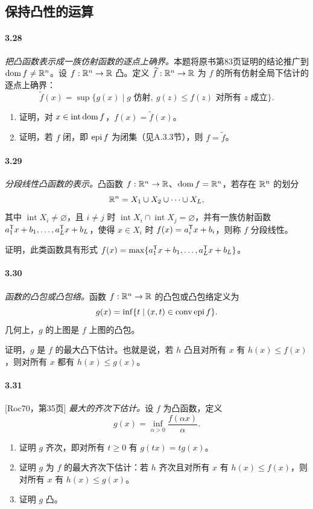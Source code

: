 \subsection*{保持凸性的运算}
\paragraph{3.28}\textit{把凸函数表示成一族仿射函数的逐点上确界。}本题将原书第83页证明的结论推广到 $\operatorname{dom} f\ne\mathbb R^n$。设 $f:\mathbb R^n\to\mathbb R$ 凸。定义 $\widetilde f:\mathbb R^n\to\mathbb R$ 为 $f$ 的所有仿射全局下估计的逐点上确界：
\[\widetilde f(x)=\sup\{g(x)\mid g\text{ 仿射},\ g(z)\leq f(z)\text{ 对所有 }z\text{ 成立}\}.\]
\begin{enumerate}[label=(\alph*)]
\item 证明，对 $x\in\operatorname{int}\operatorname{dom} f$，$f(x)=\widetilde f(x)$。
\item 证明，若 $f$ 闭，即 $\operatorname{epi} f$ 为闭集（见A.3.3节），则 $f=\widetilde f$。
\end{enumerate}
\paragraph{3.29}\textit{分段线性凸函数的表示。}凸函数 $f:\mathbb R^n\to\mathbb R$、$\operatorname{dom} f=\mathbb R^n$，若存在 $\mathbb R^n$ 的划分
\[\mathbb R^n=X_1\cup X_2\cup\cdots\cup X_L,\]
其中 $\operatorname{int}X_i\ne\varnothing$，且 $i\ne j$ 时 $\operatorname{int}X_i\cap\operatorname{int}X_j=\varnothing$，并有一族仿射函数 $a_1^\mathsf T x+b_1,\ldots,a_L^\mathsf T x+b_L$，使得 $x\in X_i$ 时 $f(x)=a_i^\mathsf T x+b_i$，则称 $f$ 分段线性。

证明，此类函数具有形式 $f(x)=\max\{a_1^\mathsf T x+b_1,\ldots,a_L^\mathsf T x+b_L\}$。
\paragraph{3.30}\textit{函数的凸包或凸包络。}函数 $f:\mathbb R^n\to\mathbb R$ 的凸包或凸包络定义为
\[g(x)=\inf\{t\mid(x,t)\in\operatorname{conv}\operatorname{epi} f\}.\]
几何上，$g$ 的上图是 $f$ 上图的凸包。

证明，$g$ 是 $f$ 的最大凸下估计。也就是说，若 $h$ 凸且对所有 $x$ 有 $h(x)\leq f(x)$，则对所有 $x$ 都有 $h(x)\leq g(x)$。
\paragraph{3.31}[Roc70，第35页] \textit{最大的齐次下估计。}设 $f$ 为凸函数，定义
\[g(x)=\inf_{\alpha>0}\frac{f(\alpha x)}\alpha.\]
\begin{enumerate}[label=(\alph*)]
\item 证明 $g$ 齐次，即对所有 $t\geq0$ 有 $g(tx)=tg(x)$。
\item 证明 $g$ 为 $f$ 的最大齐次下估计：若 $h$ 齐次且对所有 $x$ 有 $h(x)\leq f(x)$，则对所有 $x$ 有 $h(x)\leq g(x)$。
\item 证明 $g$ 凸。
\end{enumerate}
